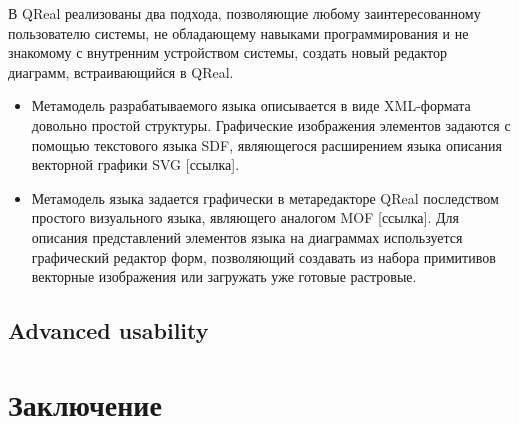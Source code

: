 \documentclass[a4paper]{article}
\begin{document}
В QReal реализованы два подхода, позволяющие любому заинтересованному пользователю системы, не обладающему навыками программирования и не знакомому с внутренним устройством системы, создать новый редактор диаграмм, встраивающийся в QReal.
\begin{itemize}
  \item Метамодель разрабатываемого языка описывается в виде XML-формата довольно простой структуры. Графические изображения элементов задаются с помощью текстового языка SDF, являющегося расширением языка описания векторной графики SVG [ссылка].
  \item Метамодель языка задается графически в метаредакторе QReal последством простого визуального языка, являющего аналогом MOF [ссылка]. Для описания представлений элементов языка на диаграммах используется графический редактор форм, позволяющий создавать из набора примитивов векторные изображения или загружать уже готовые растровые.
\end{itemize}








\subsection{Advanced usability}

\section{Заключение}
\end{document}
